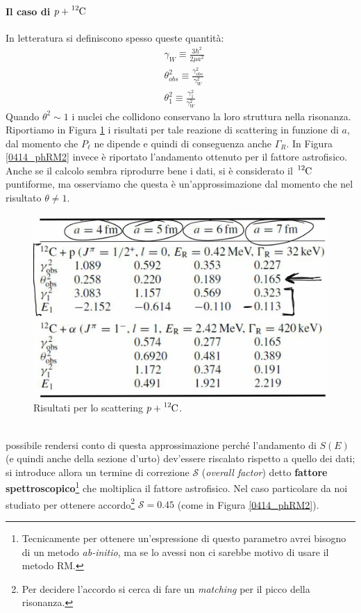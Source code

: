 \paragraph{Il caso di $p + \ce{^{12}C}$}
In letteratura si definiscono spesso queste quantità:
\begin{align*}
	&\gamma_W \equiv \frac{3\hbar^2}{2\mu a^2} \\
	&\theta_{obs}^2 \equiv \frac{\gamma^2_{obs}}{\gamma_W^2} \\
	&\theta_{1}^2 \equiv \frac{\gamma^2_{1}}{\gamma_W^2}
\end{align*}
Quando $\theta^2\sim 1$ i nuclei che collidono conservano la loro struttura nella risonanza.
Riportiamo in Figura \ref{0414_phRM1} i risultati per tale reazione di scattering in funzione di $a$, dal momento che $P_\ell$ ne dipende e quindi di conseguenza anche $\Gamma_R$. In Figura \ref{0414_phRM2} invece è riportato l'andamento ottenuto per il fattore astrofisico. Anche se il calcolo sembra riprodurre bene i dati, si è considerato il $\ce{^{12}C}$ puntiforme, ma osserviamo che questa è un'approssimazione dal momento che nel risultato $\theta\not = 1$.
\begin{figure}[h]
	\centering
	\includegraphics[scale=0.3]{Immagini/0414_RM.png}
	\caption{Risultati per lo scattering $p + \ce{^{12}C}$.}
	\label{0414_phRM1}
\end{figure}
\\
\noindent {} possibile rendersi conto di questa approssimazione perché l'andamento di $S(E)$ (e quindi anche della sezione d'urto) dev'essere riscalato rispetto a quello dei dati; si introduce allora un termine di correzione $\mathcal{S}$ (\textit{overall factor}) detto \textbf{fattore spettroscopico}\footnote{Tecnicamente per ottenere un'espressione di questo parametro avrei bisogno di un metodo \textit{ab-initio}, ma se lo avessi non ci sarebbe motivo di usare il metodo RM.} che moltiplica il fattore astrofisico. Nel caso particolare da noi studiato per ottenere accordo\footnote{Per decidere l'accordo si cerca di fare un \textit{matching} per il picco della risonanza.} $\mathcal{S} = 0.45$ (come in Figura \ref{0414_phRM2}).
